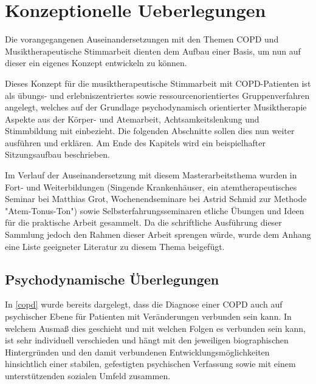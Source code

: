 
\ifpdf
\graphicspath{{4_konzept/figures/PNG/}{4_konzept/figures/PDF/}{4_konzept/figures/}}
\else
    \graphicspath{{4_konzept/figures/EPS/}{4_konzept/figures/}}
\fi

\chapter{Konzeptionelle Ueberlegungen}
\label{chapter:konzeptionelle_ueberlegungen}
Die vorangegangenen Auseinandersetzungen mit den Themen COPD und Musiktherapeutische Stimmarbeit dienten dem Aufbau einer Basis, um nun auf dieser ein eigenes Konzept entwickeln zu können. 

Dieses Konzept für die musiktherapeutische Stimmarbeit mit COPD-Patienten ist als übungs- und erlebniszentriertes sowie ressourcenorientiertes Gruppenverfahren angelegt, welches auf der Grundlage psychodynamisch orientierter Musiktherapie Aspekte aus der Körper- und Atemarbeit, Achtsamkeitslenkung und Stimmbildung mit einbezieht. Die folgenden Abschnitte sollen dies nun weiter ausführen und erklären. Am Ende des Kapitels wird ein beispielhafter Sitzungsaufbau beschrieben. %

Im Verlauf der Auseinandersetzung mit diesem Masterarbeitsthema wurden in Fort- und Weiterbildungen (Singende Krankenhäuser, ein atemtherapeutisches Seminar bei Matthias Grot, Wochenendseminare bei Astrid Schmid zur Methode "Atem-Tonus-Ton") sowie Selbsterfahrungsseminaren etliche Übungen und Ideen für die praktische Arbeit gesammelt. Da die schriftliche Ausführung dieser Sammlung jedoch den Rahmen dieser Arbeit sprengen würde, wurde dem Anhang eine Liste geeigneter Literatur zu diesem Thema beigefügt.

\section{Psychodynamische Überlegungen}
\label{psychodynamische ueberlegungen}
In \ref{copd} wurde bereits dargelegt, dass die Diagnose einer COPD auch auf psychischer Ebene für Patienten mit Veränderungen verbunden sein kann. In welchem Ausmaß dies geschieht und mit welchen Folgen es verbunden sein kann, ist sehr individuell verschieden und hängt mit den jeweiligen biographischen Hintergründen und den damit verbundenen Entwicklungsmöglichkeiten hinsichtlich einer stabilen, gefestigten psychischen Verfassung sowie mit einem unterstützenden sozialen Umfeld zusammen. 

